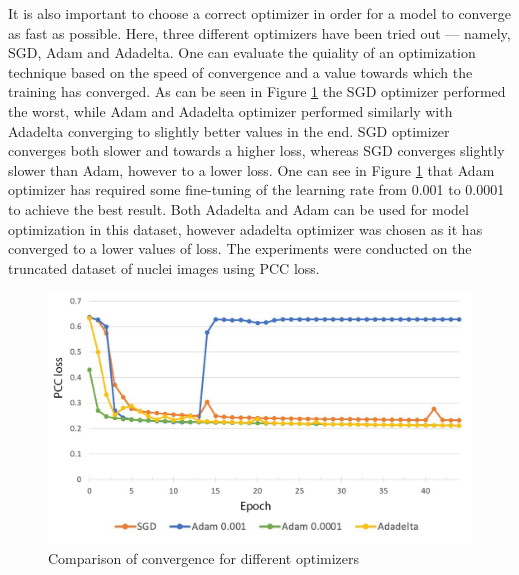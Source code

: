 It is also important to choose a correct optimizer in order for a model to converge as fast as possible. Here, three different optimizers have been tried out --- namely, SGD, Adam and Adadelta. One can evaluate the quiality of an optimization technique based on the speed of convergence and a value towards which the training has converged. As can be seen in Figure \ref{fig:optimizers} the SGD optimizer performed the worst, while Adam and Adadelta optimizer performed similarly with Adadelta converging to slightly better values in the end. SGD optimizer converges both slower and towards a higher loss, whereas SGD converges slightly slower than Adam, however to a lower loss. One can see in Figure \ref{fig:optimizers} that Adam optimizer has required some fine-tuning of the learning rate from 0.001 to 0.0001 to achieve the best result. Both Adadelta and Adam can be used for model optimization in this dataset, however adadelta optimizer was chosen as it has converged to a lower values of loss. The experiments were conducted on the truncated dataset of nuclei images using PCC loss.

\begin{figure}[htb]
	\begin{center}
		\includegraphics[width=0.8\linewidth]{bilder/model training/optimizer-comparison.png}
		\caption{Comparison of convergence for different optimizers}\label{fig:optimizers}
	\end{center}
\end{figure}
